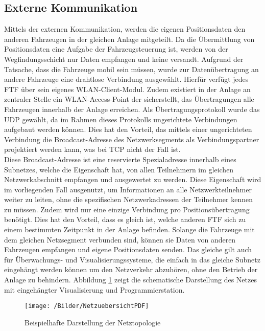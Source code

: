 	\subsection{Externe Kommunikation}
		\label{Externe Kommunikation}
		Mittels der externen Kommunikation, werden die eigenen Positionsdaten den anderen Fahrzeugen in der gleichen Anlage mitgeteilt. Da die Übermittlung von Positionsdaten eine Aufgabe der Fahrzeugsteuerung ist, werden von der Wegfindungsschicht nur Daten empfangen und keine versandt. Aufgrund der Tatsache, dass die Fahrzeuge mobil sein müssen, wurde zur Datenübertragung an andere Fahrzeuge eine drahtlose Verbindung ausgewählt. Hierfür verfügt jedes \ac{FTF} über sein eigenes \acs{WLAN}-Client-Modul. Zudem existiert in der Anlage an zentraler Stelle ein \acs{WLAN}-Access-Point der sicherstellt, das Übertragungen alle Fahrzeugen innerhalb der Anlage erreichen. Als Übertragungsprotokoll wurde das \ac{UDP} gewählt, da im Rahmen dieses Protokolls ungerichtete Verbindungen aufgebaut werden können. Dies hat den Vorteil, das mittels einer ungerichteten Verbindung die Broadcast-Adresse des Netzwerksegments als Verbindungspartner projektiert werden kann, was bei \ac{TCP} nicht der Fall ist. 
		\\[4pt]
		Diese Broadcast-Adresse ist eine reservierte Spezialadresse innerhalb eines Subnetzes, welche die Eigenschaft hat, von allen Teilnehmern im gleichen Netzwerkabschnitt empfangen und ausgewertet zu werden. Diese Eigenschaft wird im vorliegenden Fall ausgenutzt, um Informationen an alle Netzwerkteilnehmer weiter zu leiten, ohne die spezifischen Netzwerkadressen der Teilnehmer kennen zu müssen. Zudem wird nur eine einzige Verbindung pro Positionsübertragung benötigt. Dies hat den Vorteil, dass es gleich ist, welche anderen \ac{FTF} sich zu einem bestimmten Zeitpunkt in der Anlage befinden. Solange die Fahrzeuge mit dem gleichen Netzsegment verbunden sind, können sie Daten von anderen Fahrzeugen empfangen und eigene Positionsdaten senden. Das gleiche gilt auch für Überwachungs- und Visualisierungssysteme, die einfach in das gleiche Subnetz eingehängt werden können um den Netzverkehr abzuhören, ohne den Betrieb der Anlage zu behindern. Abbildung \ref{Netzuebersicht} zeigt die schematische Darstellung des Netzes mit eingehängter Visualisierung und Programmierstation.
		\\
		\begin{figure}
			\centering
			\texttt{[image: /Bilder/NetzuebersichtPDF]}
			\vspace{0.2cm}
			\caption{Beispielhafte Darstellung der Netztopologie}\label{Netzuebersicht}
		\end{figure}
